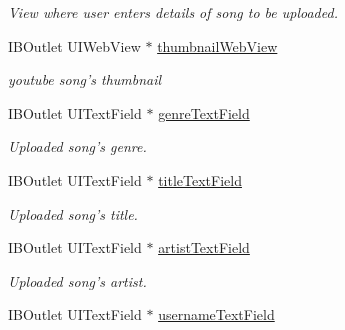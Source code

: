 \begin{DoxyCompactItemize}
\begin{DoxyCompactList}\small\item\em View where user enters details of song to be uploaded. \end{DoxyCompactList}\item 
\hypertarget{interface_c_b_h_view_controller_ac45c42f77d2b9716de9121d17d03b2a3}{I\-B\-Outlet U\-I\-Web\-View $\ast$ \hyperlink{interface_c_b_h_view_controller_ac45c42f77d2b9716de9121d17d03b2a3}{thumbnail\-Web\-View}}\label{interface_c_b_h_view_controller_ac45c42f77d2b9716de9121d17d03b2a3}

\begin{DoxyCompactList}\small\item\em youtube song's thumbnail \end{DoxyCompactList}\item 
\hypertarget{interface_c_b_h_view_controller_a3e84c0f2fe5a22a12e9798b7db14d558}{I\-B\-Outlet U\-I\-Text\-Field $\ast$ \hyperlink{interface_c_b_h_view_controller_a3e84c0f2fe5a22a12e9798b7db14d558}{genre\-Text\-Field}}\label{interface_c_b_h_view_controller_a3e84c0f2fe5a22a12e9798b7db14d558}

\begin{DoxyCompactList}\small\item\em Uploaded song's genre. \end{DoxyCompactList}\item 
\hypertarget{interface_c_b_h_view_controller_ad6496527c6783d1937a1fd87789b03e6}{I\-B\-Outlet U\-I\-Text\-Field $\ast$ \hyperlink{interface_c_b_h_view_controller_ad6496527c6783d1937a1fd87789b03e6}{title\-Text\-Field}}\label{interface_c_b_h_view_controller_ad6496527c6783d1937a1fd87789b03e6}

\begin{DoxyCompactList}\small\item\em Uploaded song's title. \end{DoxyCompactList}\item 
\hypertarget{interface_c_b_h_view_controller_ad98203c999347b05e41153153f9a09da}{I\-B\-Outlet U\-I\-Text\-Field $\ast$ \hyperlink{interface_c_b_h_view_controller_ad98203c999347b05e41153153f9a09da}{artist\-Text\-Field}}\label{interface_c_b_h_view_controller_ad98203c999347b05e41153153f9a09da}

\begin{DoxyCompactList}\small\item\em Uploaded song's artist. \end{DoxyCompactList}\item 
\hypertarget{interface_c_b_h_view_controller_a2ddc25fcaa0fba72e1c92fb0658d6597}{I\-B\-Outlet U\-I\-Text\-Field $\ast$ \hyperlink{interface_c_b_h_view_controller_a2ddc25fcaa0fba72e1c92fb0658d6597}{username\-Text\-Field}}\label{interface_c_b_h_view_controller_a2ddc25fcaa0fba72e1c92fb0658d6597}


\end{DoxyCompactItemize}
